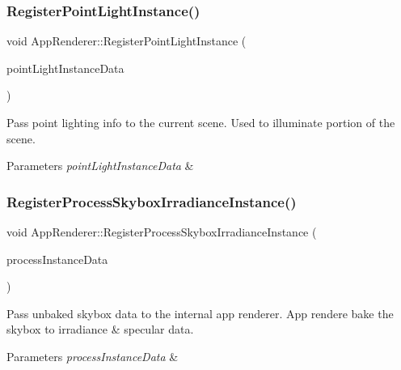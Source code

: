 \subsubsection{\texorpdfstring{Register\+Point\+Light\+Instance()}{RegisterPointLightInstance()}}
{\footnotesize\ttfamily void App\+Renderer\+::\+Register\+Point\+Light\+Instance (\begin{DoxyParamCaption}\item[{const \hyperlink{structPointLightInstanceData}{Point\+Light\+Instance\+Data} \&}]{point\+Light\+Instance\+Data }\end{DoxyParamCaption})}



Pass point lighting info to the current scene. Used to illuminate portion of the scene. 


\begin{DoxyParams}{Parameters}
{\em point\+Light\+Instance\+Data} & \\
\hline
\end{DoxyParams}
\mbox{\label{classAppRenderer_a46cea9dbc355592e2b3d74b8ef297175}} 
\subsubsection{\texorpdfstring{Register\+Process\+Skybox\+Irradiance\+Instance()}{RegisterProcessSkyboxIrradianceInstance()}}
{\footnotesize\ttfamily void App\+Renderer\+::\+Register\+Process\+Skybox\+Irradiance\+Instance (\begin{DoxyParamCaption}\item[{const \hyperlink{structProcessSkyboxIrradianceInstanceData}{Process\+Skybox\+Irradiance\+Instance\+Data} \&}]{process\+Instance\+Data }\end{DoxyParamCaption})}



Pass unbaked skybox data to the internal app renderer. App rendere bake the skybox to irradiance \& specular data. 


\begin{DoxyParams}{Parameters}
{\em process\+Instance\+Data} & \\
\hline
\end{DoxyParams}
\mbox{\label{classAppRenderer_aaca975e8c6b1ac11095591926d942e4c}} 
